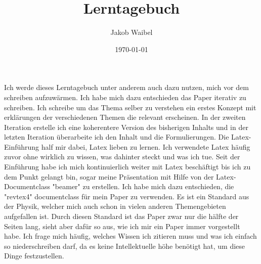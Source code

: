 \documentclass{scrarticle}
\begin{document}
\title{Lerntagebuch}
\author{Jakob Waibel}
\date{\today}

\maketitle 

Ich werde dieses Lerntagebuch unter anderem auch dazu nutzen, mich vor dem schreiben aufzuwärmen. 
Ich habe mich dazu entschieden das Paper iterativ zu schreiben. Ich schreibe um das Thema selber zu verstehen ein erstes Konzept mit erklärungen der verschiedenen Themen die relevant erscheinen. In der zweiten Iteration erstelle ich eine koherentere Version des bisherigen Inhalts und in der letzten Iteration überarbeite ich den Inhalt und die Formulierungen.
Die Latex-Einführung half mir dabei, Latex lieben zu lernen. Ich verwendete Latex häufig zuvor ohne wirklich zu wissen, was dahinter steckt und was ich tue. Seit der Einführung habe ich mich kontinuierlich weiter mit Latex beschäftigt bis ich zu dem Punkt gelangt bin, sogar meine Präsentation mit Hilfe von der Latex-Documentclass "beamer" zu erstellen. 
Ich habe mich dazu entschieden, die "revtex4" documentclass für mein Paper zu verwenden. Es ist ein Standard aus der Physik, welcher mich auch schon in vielen anderen Themengebieten aufgefallen ist. Durch diesen Standard ist das Paper zwar nur die hälfte der Seiten lang, sieht aber dafür so aus, wie ich mir ein Paper immer vorgestellt habe. 
Ich frage mich häufig, welches Wissen ich zitieren muss und was ich einfach so niederschreiben darf, da es keine Intellektuelle höhe benötigt hat, um diese Dinge festzustellen. 
\end{document}
